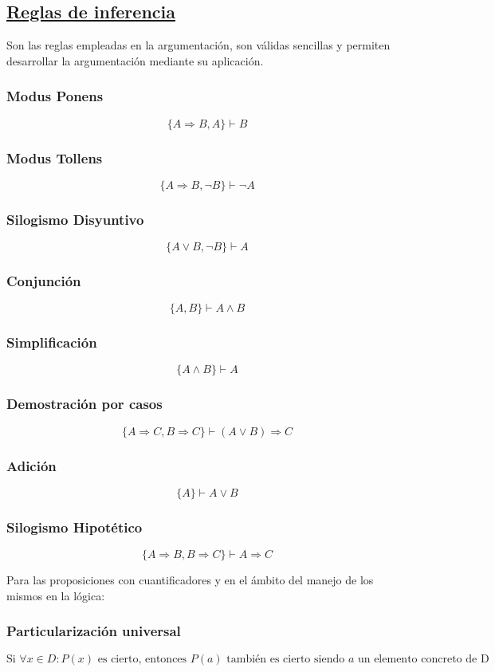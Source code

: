 \documentclass[10pt,a4paper,openright]{book}
\begin{document}
\subsection*{\underline{Reglas de inferencia}}
Son las reglas empleadas en la argumentación, son válidas sencillas y permiten desarrollar la argumentación mediante su aplicación.
\begin{multicols}{2}
\subsubsection*{Modus Ponens}
$$\{A \Rightarrow B, A\}\vdash B$$
\subsubsection*{Modus Tollens}
$$\{A \Rightarrow B,\neg B\}\vdash \neg A $$
\subsubsection*{Silogismo Disyuntivo}
$$\{A \vee B, \neg B\}\vdash A$$
\subsubsection*{Conjunción}
$$\{A, B\}\vdash A\wedge B$$
\subsubsection*{Simplificación}
$$\{A\wedge B\}\vdash A$$
\subsubsection*{Demostración por casos}
$$\{A\Rightarrow C, B\Rightarrow C\}\vdash (A\vee B)\Rightarrow C$$
\subsubsection*{Adición}
$$\{A\}\vdash A\vee B$$
\subsubsection*{Silogismo Hipotético}
$$\{A\Rightarrow B, B\Rightarrow C\}\vdash A\Rightarrow C$$
\end{multicols}
\vspace{1cm}
Para las proposiciones con cuantificadores y en el ámbito del manejo de los mismos en la lógica:
\subsubsection*{Particularización universal}
$$\mbox{Si }\forall x \in D : P(x)\mbox{ es cierto, entonces }P(a) \mbox{ también es cierto siendo } a \mbox{ un elemento concreto de D}$$
\end{document}
